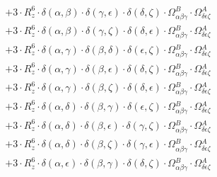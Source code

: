 \documentclass{article}
\begin{document}
\begin{equation}
\begin{array}{c}
 \\[0.2em] 		 + 3 \cdot R_{z}^{6} \cdot \delta{}\left(\alpha{}, \beta{}\right) \cdot \delta{}\left(\gamma{}, \epsilon{}\right) \cdot \delta{}\left(\delta{}, \zeta{}\right) \cdot \Omega{}^{B}_{\alpha{}\beta{}\gamma{}} \cdot \Omega{}^{A}_{\delta{}\epsilon{}\zeta{}} 
 \\[0.2em] 		 + 3 \cdot R_{z}^{6} \cdot \delta{}\left(\alpha{}, \beta{}\right) \cdot \delta{}\left(\gamma{}, \zeta{}\right) \cdot \delta{}\left(\delta{}, \epsilon{}\right) \cdot \Omega{}^{B}_{\alpha{}\beta{}\gamma{}} \cdot \Omega{}^{A}_{\delta{}\epsilon{}\zeta{}} 
 \\[0.2em] 		 + 3 \cdot R_{z}^{6} \cdot \delta{}\left(\alpha{}, \gamma{}\right) \cdot \delta{}\left(\beta{}, \delta{}\right) \cdot \delta{}\left(\epsilon{}, \zeta{}\right) \cdot \Omega{}^{B}_{\alpha{}\beta{}\gamma{}} \cdot \Omega{}^{A}_{\delta{}\epsilon{}\zeta{}} 
 \\[0.2em] 		 + 3 \cdot R_{z}^{6} \cdot \delta{}\left(\alpha{}, \gamma{}\right) \cdot \delta{}\left(\beta{}, \epsilon{}\right) \cdot \delta{}\left(\delta{}, \zeta{}\right) \cdot \Omega{}^{B}_{\alpha{}\beta{}\gamma{}} \cdot \Omega{}^{A}_{\delta{}\epsilon{}\zeta{}} 
 \\[0.2em] 		 + 3 \cdot R_{z}^{6} \cdot \delta{}\left(\alpha{}, \gamma{}\right) \cdot \delta{}\left(\beta{}, \zeta{}\right) \cdot \delta{}\left(\delta{}, \epsilon{}\right) \cdot \Omega{}^{B}_{\alpha{}\beta{}\gamma{}} \cdot \Omega{}^{A}_{\delta{}\epsilon{}\zeta{}} 
 \\[0.2em] 		 + 3 \cdot R_{z}^{6} \cdot \delta{}\left(\alpha{}, \delta{}\right) \cdot \delta{}\left(\beta{}, \gamma{}\right) \cdot \delta{}\left(\epsilon{}, \zeta{}\right) \cdot \Omega{}^{B}_{\alpha{}\beta{}\gamma{}} \cdot \Omega{}^{A}_{\delta{}\epsilon{}\zeta{}} 
 \\[0.2em] 		 + 3 \cdot R_{z}^{6} \cdot \delta{}\left(\alpha{}, \delta{}\right) \cdot \delta{}\left(\beta{}, \epsilon{}\right) \cdot \delta{}\left(\gamma{}, \zeta{}\right) \cdot \Omega{}^{B}_{\alpha{}\beta{}\gamma{}} \cdot \Omega{}^{A}_{\delta{}\epsilon{}\zeta{}} 
 \\[0.2em] 		 + 3 \cdot R_{z}^{6} \cdot \delta{}\left(\alpha{}, \delta{}\right) \cdot \delta{}\left(\beta{}, \zeta{}\right) \cdot \delta{}\left(\gamma{}, \epsilon{}\right) \cdot \Omega{}^{B}_{\alpha{}\beta{}\gamma{}} \cdot \Omega{}^{A}_{\delta{}\epsilon{}\zeta{}} 
 \\[0.2em] 		 + 3 \cdot R_{z}^{6} \cdot \delta{}\left(\alpha{}, \epsilon{}\right) \cdot \delta{}\left(\beta{}, \gamma{}\right) \cdot \delta{}\left(\delta{}, \zeta{}\right) \cdot \Omega{}^{B}_{\alpha{}\beta{}\gamma{}} \cdot \Omega{}^{A}_{\delta{}\epsilon{}\zeta{}} 

\end{array}
\end{equation}
\end{document}
